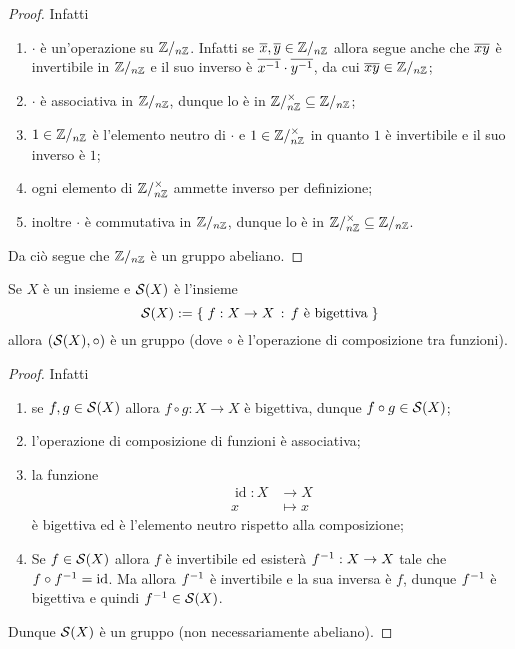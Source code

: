 \begin{proof}
    Infatti \begin{enumerate}[label={(G\arabic*)}, start=0]
        \item $\cdot$ è un'operazione su $\mathbb{Z}/_{n\mathbb{Z}}$. Infatti se $\eqcl x, \eqcl y \in \Zmod{n}$ allora segue anche che $\eqcl{xy}$ è invertibile in $\mathbb{Z}/_{n\mathbb{Z}}$ e il suo inverso è $\eqcl{x\inv} \cdot \eqcl{y\inv}$, da cui $\eqcl{xy} \in \Zmod n$;
        \item $\cdot$ è associativa in $\mathbb{Z}/_{n\mathbb{Z}}$, dunque lo è in $\mathbb{Z}/_{n\mathbb{Z}}^{\times} \subseteq \mathbb{Z}/_{n\mathbb{Z}}$;
        \item $1 \in \mathbb{Z}/_{n\mathbb{Z}}$ è l'elemento neutro di $\cdot$ e $1 \in \mathbb{Z}/_{n\mathbb{Z}}^{\times}$ in quanto $1$ è invertibile e il suo inverso è $1$;
        \item ogni elemento di $\mathbb{Z}/_{n\mathbb{Z}}^{\times}$ ammette inverso per definizione;
        \item inoltre $\cdot$ è commutativa in $\mathbb{Z}/_{n\mathbb{Z}}$, dunque lo è in $\mathbb{Z}/_{n\mathbb{Z}}^{\times} \subseteq \mathbb{Z}/_{n\mathbb{Z}}$.
    \end{enumerate}
    Da ciò segue che $\mathbb{Z}/_{n\mathbb{Z}}$ è un gruppo abeliano.
\end{proof}
\begin{example}
    Se $X$ è un insieme e $\mathcal{S}(X)$ è l'insieme \[
        \mathcal{S}(X) := \left\{\;f : X \to X \,:\, f \text{ è bigettiva}\;\right\}    
    \] allora $(\mathcal{S}(X), \circ)$ è un gruppo (dove $\circ$ è l'operazione di composizione tra funzioni).
\end{example}
\begin{proof}
    Infatti \begin{enumerate}[label={(G\arabic*)}, start=0]
        \item se $f, g \in \mathcal{S}(X)$ allora $f \circ g : X \to X$ è bigettiva, dunque $f \circ g \in \mathcal{S}(X)$;
        \item l'operazione di composizione di funzioni è associativa;
        \item la funzione \begin{align*}
            \operatorname{id} : X &\to X\\
            x &\mapsto x
        \end{align*} è bigettiva ed è l'elemento neutro rispetto alla composizione;
        \item Se $f \in \mathcal{S}(X)$ allora $f$ è invertibile ed esisterà $f^{-1} : X \to X$ tale che $f \circ f^{-1} = \operatorname{id}$. Ma allora $f^{-1}$ è invertibile e la sua inversa è $f$, dunque $f^{-1}$ è bigettiva e quindi $f^{-1} \in \mathcal{S}(X)$.
    \end{enumerate}
    Dunque $\mathcal{S}(X)$ è un gruppo (non necessariamente abeliano).
\end{proof}


